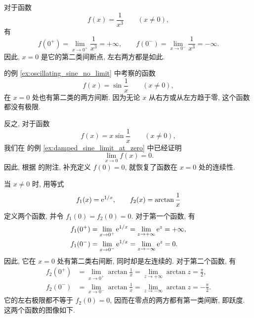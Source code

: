 \label{ex:inverse_cube_discontinuity}
对于函数
$$
f(x)=\frac1{x^3}\qquad(x\neq0),
$$
有
$$
f(0^+)=\lim_{x\to0^+}\frac1{x^3}=+\infty,
\qquad
f(0^-)=\lim_{x\to0^-}\frac1{x^3}=-\infty.
$$
因此, $x=0$ 是它的第二类间断点, 左右两方都是如此.

\label{ex:oscillating_sine_discontinuity}
 的例 \ref{ex:oscillating_sine_no_limit} 中考察的函数
$$
f(x)=\sin\frac1x\qquad(x\neq0),
$$
在 $x=0$ 处也有第二类的两方间断.
因为无论 $x$ 从右方或从左方趋于零, 这个函数都没有极限.

\label{ex:damped_sine_continuous_extension}
反之, 对于函数
$$
f(x)=x\sin\frac1x\qquad(x\neq0),
$$
我们在  的例 \ref{ex:damped_sine_limit_at_zero} 中已经证明
$$
\lim_{x\to0}f(x)=0.
$$
因此, 根据  的附注, 补充定义 $f(0)=0$,
就恢复了函数在 $x=0$ 处的连续性.

\label{ex:exponential_arctangent_discontinuities}
当 $x\neq0$ 时, 用等式
$$
f_1(x)=\mathrm{e}^{1/x},\qquad f_2(x)=\arctan\frac1x
$$
定义两个函数, 并令 $f_1(0)=f_2(0)=0$.
对于第一个函数, 有
$$
\begin{aligned}
f_1(0^+)&=\lim_{x\to0^+}\mathrm{e}^{1/x}=\lim_{z\to+\infty}\mathrm{e}^z=+\infty,\\
f_1(0^-)&=\lim_{x\to0^-}\mathrm{e}^{1/x}=\lim_{z\to-\infty}\mathrm{e}^z=0.
\end{aligned}
$$
因此, 它在 $x=0$ 处有第二类右间断, 同时却是左连续的.
对于第二个函数, 有
$$
\begin{aligned}
f_2(0^+)&=\lim_{x\to0^+}\arctan\frac1x
=\lim_{z\to+\infty}\arctan z=\frac\pi2,\\
f_2(0^-)&=\lim_{x\to0^-}\arctan\frac1x
=\lim_{z\to-\infty}\arctan z=-\frac\pi2.
\end{aligned}
$$
它的左右极限都不等于 $f_2(0)=0$, 因而在零点的两方都有第一类间断, 即跃度.
这两个函数的图像如下.


